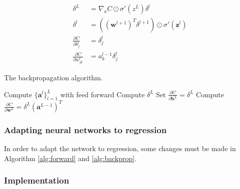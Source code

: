 \begin{equation}\label{eq:backprop}
\begin{aligned}
	\delta^L &= \nabla_aC\odot\sigma'(z^L)\delta^l \\ 
	\delta^l &= ((\boldsymbol{w}^{l+1})^T\delta^{l+1})\odot\sigma'(\boldsymbol{z}^l) \\
	\frac{\partial C}{\partial b^l_j} &= \delta_j^l \\
	\frac{\partial C}{\partial w_{jk}^l} &= a_k^{l-1}\delta^l_j
\end{aligned}
\end{equation}


\begin{algorithm}[htbp]\caption{The backpropagation algorithm.}\label{alg:backprop}
	\SetAlgoLined
	\BlankLine
	\BlankLine
	Compute $\{ \boldsymbol{a}^l\}_{l=1}^L$ with feed forward\;
	Compute $\delta^L$\;
	Set $\frac{\partial C}{\partial \boldsymbol{b}^L} = \delta^L$\;
	Compute $\frac{\partial C}{\partial \boldsymbol{w}^L} = \delta^L(\boldsymbol{a}^{L-1})^T$\;
	\BlankLine
	\BlankLine
	\end{algorithm}
	
\subsubsection*{Adapting neural networks to regression}
In order to adapt the network to regression, some changes must be made in Algorithm \ref{alg:forward} and \ref{alg:backprop}.  

\subsubsection*{Implementation}


